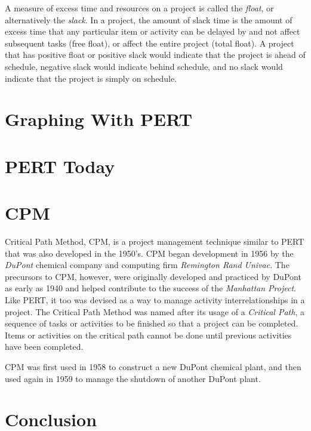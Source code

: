 \documentclass[12pt]{article}
\begin{document}
A measure of excess time and resources on a project is called the \textit{float}, or alternatively the \textit{slack}.  In a project, the amount of slack time is the amount of excess time that any particular item or activity can be delayed by and not affect subsequent tasks (free float), or affect the entire project (total float).  A project that has positive float or positive slack would indicate that the project is ahead of schedule, negative slack would indicate behind schedule, and no slack would indicate that the project is simply on schedule.
\section{Graphing With PERT}

\section{PERT Today}

\section{CPM}
Critical Path Method, CPM, is a project management technique similar to PERT that was also developed in the 1950's.
CPM began development in 1956 by the \textit{DuPont} chemical company and computing firm \textit{Remington Rand Univac}.  The precursors to CPM, however, were originally developed and practiced by DuPont as early as 1940 and helped contribute to the success of the \textit{Manhattan Project}. 
Like PERT, it too was devised as a way to manage activity interrelationships in a project.
The Critical Path Method was named after its usage of a \textit{Critical Path}, a sequence of tasks or activities to be finished so that a project can be completed.
Items or activities on the critical path cannot be done until previous activities have been completed.

CPM was first used in 1958 to construct a new DuPont chemical plant, and then used again in 1959 to manage the shutdown of another DuPont plant.
\section{Conclusion}
\end{document}
